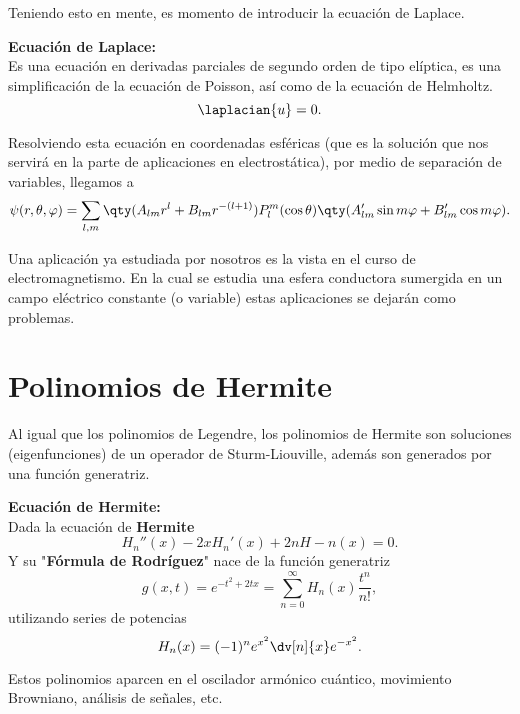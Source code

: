 Teniendo esto en mente, es momento de introducir la ecuación de Laplace.




\begin{mdframed}[style=warning]
	{\Large \textbf{Ecuación de Laplace:}} \\
	Es una ecuación en derivadas parciales de segundo orden de tipo elíptica, es una simplificación de la ecuación de Poisson, así como de la ecuación de Helmholtz.
		$$ \laplacian{u} = 0. $$
\end{mdframed}


Resolviendo esta ecuación en coordenadas esféricas (que es la solución que nos servirá en la parte de aplicaciones en electrostática), por medio de separación de variables, llegamos a
	$$ \psi (r,\theta ,\varphi) = \sum _{l,m} \qty(A_{lm} r^l + B_{lm} r^{-(l + 1)}) P_l ^m (\cos{\theta}) \qty(A_{lm} ^\prime \sin{m\varphi} + B_{lm} ^\prime \cos{m\varphi}). $$
	
Una aplicación ya estudiada por nosotros es la vista en el curso de electromagnetismo. En la cual se estudia una esfera conductora sumergida en un campo eléctrico constante (o variable) estas aplicaciones se dejarán como problemas.







\section*{Polinomios de Hermite}
Al igual que los polinomios de Legendre, los polinomios de Hermite son soluciones (eigenfunciones) de un operador de Sturm-Liouville, además son generados por una función generatriz.

\begin{mdframed}[style=warning]
	{\Large \textbf{Ecuación de Hermite:}} \\
	Dada la ecuación de \textbf{Hermite}
		$$ H_n '' (x) - 2xH_n '(x) + 2nH-n (x) = 0. $$
	Y su "\textbf{Fórmula de Rodríguez}" nace de la función generatriz
		$$ g(x,t) = e^{-t^2 + 2tx} = \sum _{n = 0} ^\infty H_n (x) \frac{t^n}{n!}, $$
	utilizando series de potencias
		$$ H_n (x) = (-1)^n e^{x^2} \dv[n]{x} e^{-x^2}. $$
\end{mdframed}

Estos polinomios aparcen en el oscilador armónico cuántico, movimiento Browniano, análisis de señales, etc.











